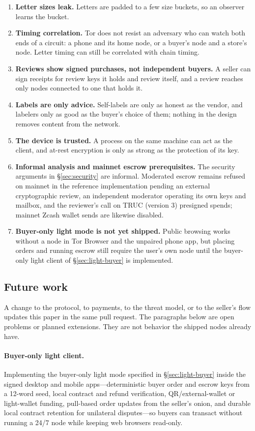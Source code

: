 \begin{enumerate}
  \item \textbf{Letter sizes leak.} Letters are padded to a few size buckets, so an observer learns the bucket.
  \item \textbf{Timing correlation.} Tor does not resist an adversary who can watch both ends of a circuit: a phone and its home node, or a buyer's node and a store's node. Letter timing can still be correlated with chain timing.
  \item \textbf{Reviews show signed purchases, not independent buyers.} A seller can sign receipts for review keys it holds and review itself, and a review reaches only nodes connected to one that holds it.
  \item \textbf{Labels are only advice.} Self-labels are only as honest as the vendor, and labelers only as good as the buyer's choice of them; nothing in the design removes content from the network.
  \item \textbf{The device is trusted.} A process on the same machine can act as the client, and at-rest encryption is only as strong as the protection of its key.
  \item \textbf{Informal analysis and mainnet escrow prerequisites.} The security arguments in \S\ref{sec:security} are informal. Moderated escrow remains refused on mainnet in the reference implementation pending an external cryptographic review, an independent moderator operating its own keys and mailbox, and the reviewer's call on TRUC (version 3) presigned spends; mainnet Zcash wallet sends are likewise disabled.
  \item \textbf{Buyer-only light mode is not yet shipped.} Public browsing works without a node in Tor Browser and the unpaired phone app, but placing orders and running escrow still require the user's own node until the buyer-only light client of \S\ref{sec:light-buyer} is implemented.
\end{enumerate}

\subsection{Future work}
\label{sec:future}

A change to the protocol, to payments, to the threat model, or to the seller's flow updates this paper in the same pull request. The paragraphs below are open problems or planned extensions. They are not behavior the shipped nodes already have.

\paragraph{Buyer-only light client.} Implementing the buyer-only light mode specified in \S\ref{sec:light-buyer} inside the signed desktop and mobile apps---deterministic buyer order and escrow keys from a 12-word seed, local contract and refund verification, QR/external-wallet or light-wallet funding, pull-based order updates from the seller's onion, and durable local contract retention for unilateral disputes---so buyers can transact without running a 24/7 node while keeping web browsers read-only.

